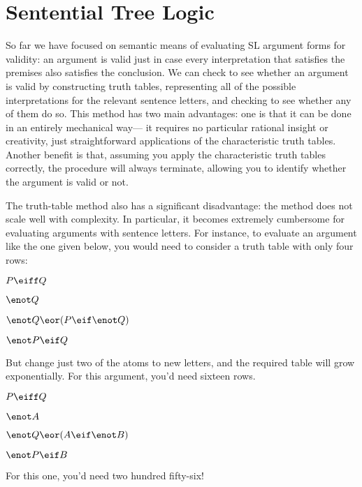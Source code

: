 \chapter{Sentential Tree Logic}
\label{ch.sl.trees}

So far we have focused on semantic means of evaluating SL argument forms for validity: an argument is valid just in case every interpretation that satisfies the premises also satisfies the conclusion.
We can check to see whether an argument is valid by constructing truth tables, representing all of the possible interpretations for the relevant sentence letters, and checking to see whether any of them do so.
This method has two main advantages: one is that it can be done in an entirely mechanical way--- it requires no particular rational insight or creativity, just straightforward applications of the characteristic truth tables.
Another benefit is that, assuming you apply the characteristic truth tables correctly, the procedure will always terminate, allowing you to identify whether the argument is valid or not.

The truth-table method also has a significant disadvantage: the method does not scale well with complexity.
In particular, it becomes extremely cumbersome for evaluating arguments with sentence letters.
For instance, to evaluate an argument like the one given below, you would need to consider a truth table with only four rows:

\begin{earg}
\item[] $P\eiff Q$
\item[] $\enot Q$
\item[] $\enot Q \eor (P \eif \enot Q)$
\item[\therefore] $\enot P \eif Q$
\end{earg}

But change just two of the atoms to new letters, and the required table will grow exponentially.
For this argument, you'd need sixteen rows.

\begin{earg}
\item[] $P\eiff Q$
\item[] $\enot A$
\item[] $\enot Q \eor (A \eif \enot B)$
\item[\therefore] $\enot P \eif B$
\end{earg}

For this one, you'd need two hundred fifty-six!

